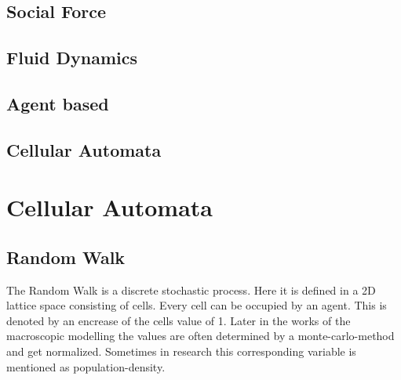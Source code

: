 \subsection{Social Force}
\subsection{Fluid Dynamics}
\subsection{Agent based}
\subsection{Cellular Automata}

\newpage
\section{Cellular Automata}
\subsection{Random Walk}
The Random Walk is a discrete stochastic process. Here it is defined in a 2D lattice space consisting of cells. Every cell can be occupied by an agent. This is denoted by an encrease of the cells value of 1. 
Later in the works of the macroscopic modelling the values are often determined by a monte-carlo-method and get normalized. 
Sometimes in research this corresponding variable is mentioned as population-density.

